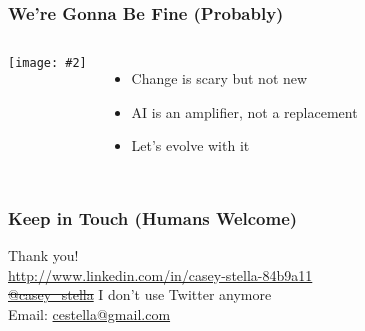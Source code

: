 \documentclass{beamer}
\newcommand{\slidewithimage}[3]{%
  \begin{frame}
    \frametitle{#1}
    \begin{columns}
      \column{0.5\textwidth}
        \texttt{[image: \#2]}\\[1em]
      \column{0.5\textwidth}
        #3
    \end{columns}
  \end{frame}
}
\begin{document}
\slidewithimage{We’re Gonna Be Fine (Probably)}{wrap-image.png}{
  \begin{itemize}
    \item Change is scary but not new
    \item AI is an amplifier, not a replacement
    \item Let’s evolve with it
  \end{itemize}
}

\begin{frame}
  \frametitle{Keep in Touch (Humans Welcome)}
  \begin{center}
    \Large Thank you! \\
    \vspace{1em}
    \href{http://www.linkedin.com/in/casey-stella-84b9a11}{http://www.linkedin.com/in/casey-stella-84b9a11} \\
    \sout{\href{https://twitter.com/casey_stella}{@casey\_stella}} I don't use Twitter anymore \\
    Email: \href{mailto:cestella@gmail.com}{cestella@gmail.com}
  \end{center}
\end{frame}
\end{document}
